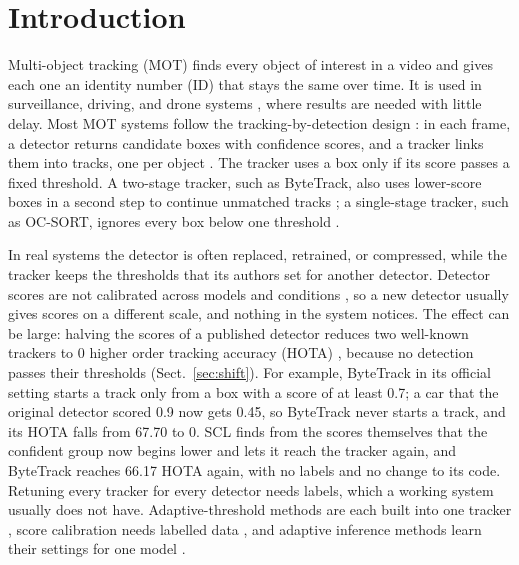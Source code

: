 \documentclass[pdflatex,sn-mathphys-num,iicol]{sn-jnl}
\newcommand{\scl}{SCL}
\begin{document}
\maketitle

\section{Introduction}\label{sec:intro}

Multi-object tracking (MOT) finds every object of interest in a video and gives each one an
identity number (ID) that stays the same over time. It is used in surveillance, driving, and drone
systems \cite{zhu2022visdrone}, where results are needed with little delay. Most
MOT systems follow the tracking-by-detection design \cite{adzemovic2026survey}: in each frame, a
detector returns candidate boxes with confidence scores, and a tracker links them into tracks, one
per object \cite{bewley2016sort,zhang2022bytetrack,cao2023ocsort}. The tracker uses a box only if
its score passes a fixed threshold. A two-stage tracker, such as ByteTrack, also uses lower-score
boxes in a second step to continue unmatched tracks \cite{zhang2022bytetrack}; a single-stage
tracker, such as OC-SORT, ignores every box below one threshold \cite{cao2023ocsort}.

In real systems the detector is often replaced, retrained, or compressed, while the tracker keeps
the thresholds that its authors set for another detector. Detector scores are not calibrated across
models and conditions \cite{kuppers2020detcalib}, so a new detector usually gives scores on a
different scale, and nothing in the system notices. The effect can be large: halving the scores of
a published detector reduces two well-known trackers to 0 higher order tracking accuracy (HOTA)
\cite{luiten2021hota}, because no detection passes their thresholds (Sect.~\ref{sec:shift}). For example, ByteTrack in
its official setting starts a track only from a box with a score of at least 0.7; a car that the
original detector scored 0.9 now gets 0.45, so ByteTrack never starts a track, and its HOTA falls
from 67.70 to 0. \scl{} finds from the scores themselves that the confident group now begins
lower and lets it reach the tracker again, and ByteTrack reaches 66.17 HOTA again, with no labels and no change to its code.
Retuning every tracker for every detector needs labels, which a working system usually does not
have. Adaptive-threshold methods are each built into one tracker
\cite{ma2023adaptivebytetrack,shim2024adaptrack,act2026adaptive}, score calibration needs
labelled data \cite{kuppers2020detcalib}, and adaptive inference methods learn their settings for
one model \cite{han2022dynamic}.
\end{document}
